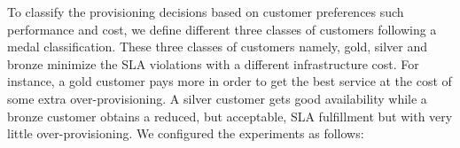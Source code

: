 
To classify the provisioning decisions based on customer preferences such  performance and cost, we define different three classes of customers following a medal classification. These three classes of customers namely, gold, silver and bronze minimize the SLA violations with a different infrastructure cost. For instance, a gold customer pays more in order to get the best service at the cost of some extra over-provisioning. A silver customer gets good availability while a bronze customer obtains a reduced, but acceptable, SLA fulfillment but with very little over-provisioning. We configured the experiments as follows:










